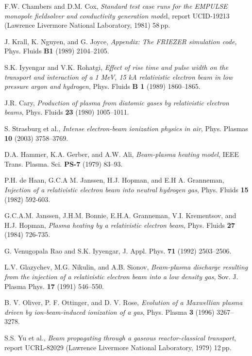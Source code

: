\documentclass [12pt,a4paper,     ]{report} %
\begin{document}
\begin{enumerate}
 F.W. Chambers and D.M. Cox, \emph{Standard test case runs for the EMPULSE monopole fieldsolver and conductivity generation mode}l, report UCID-19213 (Lawrence Livermore National Laboratory, 1981) 58\,pp.

  J. Krall, K. Nguyen, and G. Joyce, \emph{Appendix: The FRIEZER simulation code}, Phys. Fluids {\bf B1} (1989) 2104--2105.





 S.K. Iyyengar and V.K. Rohatgi, \emph{Effect of rise time and pulse width on the transport and interaction of a 1 MeV, 15 kA relativistic electron beam in low pressure argon and hydrogen}, Phys. Fluids {\bf B 1} (1989) 1860--1865.

 J.R. Cary, \emph{Production of plasma from diatomic gases by relativistic electron beams}, Phys. Fluids {\bf 23} (1980) 1005--1011.

 S. Strasburg et al., \emph{Intense electron-beam ionization physics in air}, Phys. Plasmas {\bf 10} (2003) 3758--3769.

 D.A. Hammer, K.A. Gerber, and A.W. Ali, \emph{Beam-plasma heating model}, IEEE Trans. Plasma. Sci. {\bf PS-7} (1979) 83--93.

 P.H. de Haan, G.C.A M. Janssen, H.J. Hopman, and E.H A. Granneman, \emph{Injection of a relativistic electron beam into neutral hydrogen gas},  Phys. Fluids {\bf 15} (1982) 592-603.

 G.C.A.M. Janssen, J.H.M. Bonnie, E.H.A. Granneman, V.I. Krementsov, and H.J. Hopman, \emph{Plasma heating by a relativistic electron beam},  Phys. Fluids {\bf 27} (1984) 726-735.

 G. Venugopala Rao and S.K. Iyyengar, J. Appl. Phys. {\bf 71} (1992) 2503--2506.

 L.V. Glazychev, M.G. Nikulin, and A.B. Sionov, \emph{Beam-plasma discharge resulting from the injection of a relativistic electron beam into a low density gas}, Sov. J. Plasma Phys. {\bf 17} (1991) 546--550.

 B. V. Oliver, P. F. Ottinger, and D. V. Rose, \emph{Evolution of a Maxwellian plasma driven by ion-beam-induced ionization of a gas},   Phys. Plasma {\bf 3} (1996) 3267--3278.

 S.S. Yu et al., \emph{Beam propagating through a gaseous reactor-classical transport}, report UCRL-82029 (Lawrence Livermore National Laboratory, 1979) 12\,pp.


\end{enumerate}
\end{document}
